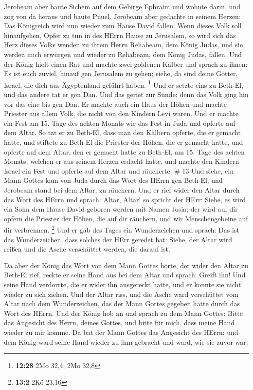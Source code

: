  Jerobeam aber baute Sichem auf dem Gebirge Ephraim und
wohnte darin, und zog von da heraus und baute Pnuel. 
Jerobeam aber gedachte in seinem Herzen: Das Königreich wird nun wieder
zum Hause David fallen.  Wenn dieses Volk soll hinaufgehen,
Opfer zu tun in des HErrn Hause zu Jerusalem, so wird sich das Herz
dieses Volks wenden zu ihrem Herrn Rehabeam, dem König Judas, und sie
werden mich erwürgen und wieder zu Rehabeam, dem König Judas, fallen.
 Und der König hielt einen Rat und machte zwei goldenen
Kälber und sprach zu ihnen: Es ist euch zuviel, hinauf gen Jerusalem zu
gehen; siehe, da sind deine Götter, Israel, die dich aus Ägyptenland
geführt haben. \footnote{\textbf{12:28} 2Mo 32,4; 2Mo 32,8}
 Und er setzte eins zu Beth-El, und das andere tat er gen
Dan.  Und das geriet zur Sünde; denn das Volk ging hin vor
das eine bis gen Dan.  Er machte auch ein Haus der Höhen
und machte Priester aus allem Volk, die nicht von den Kindern Levi
waren.  Und er machte ein Fest am 15. Tage des achten
Monats wie das Fest in Juda und opferte auf dem Altar. So tat er zu
Beth-El, dass man den Kälbern opferte, die er gemacht hatte, und
stiftete zu Beth-El die Priester der Höhen, die er gemacht hatte,
 und opferte auf dem Altar, den er gemacht hatte zu
Beth-El, am 15. Tage des achten Monats, welchen er aus seinem Herzen
erdacht hatte, und machte den Kindern Israel ein Fest und opferte auf
dem Altar und räucherte. \# 13  Und siehe, ein Mann Gottes
kam von Juda durch das Wort des HErrn gen Beth-El; und Jerobeam stand
bei dem Altar, zu räuchern.  Und er rief wider den Altar
durch das Wort des HErrn und sprach: Altar, Altar! so spricht der HErr:
Siehe, es wird ein Sohn dem Hause David geboren werden mit Namen Josia;
der wird auf dir opfern die Priester der Höhen, die auf dir räuchern,
und wir Menschengebeine auf dir verbrennen. \footnote{\textbf{13:2} 2Kö
  23,16}  Und er gab des Tages ein Wunderzeichen und sprach:
Das ist das Wunderzeichen, dass solches der HErr geredet hat: Siehe, der
Altar wird reißen und die Asche verschüttet werden, die darauf ist.

 Da aber der König das Wort von dem Mann Gottes hörte, der
wider den Altar zu Beth-El rief, reckte er seine Hand aus bei dem Altar
und sprach: Greift ihn! Und seine Hand verdorrte, die er wider ihn
ausgereckt hatte, und er konnte sie nicht wieder zu sich ziehen.
 Und der Altar riss, und die Asche ward verschüttet vom
Altar nach dem Wunderzeichen, das der Mann Gottes gegeben hatte durch
das Wort des HErrn.  Und der König hob an und sprach zu dem
Mann Gottes: Bitte das Angesicht des Herrn, deines Gottes, und bitte für
mich, dass meine Hand wieder zu mir komme. Da bat der Mann Gottes das
Angesicht des HErrn; und dem König ward seine Hand wieder zu ihm
gebracht und ward, wie sie zuvor war.

